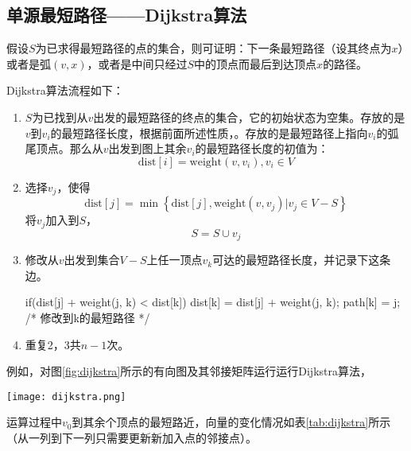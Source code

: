 \subsection{单源最短路径——Dijkstra算法}
\label{sec:dijkstra}

假设$S$为已求得最短路径的点的集合，则可证明：下一条最短路径（设其终点为$x$）或者是弧$(v, x)$，或者是中间只经过$S$中的顶点而最后到达顶点$x$的路径。

Dijkstra算法流程如下：
\begin{enumerate}
\item $S$为已找到从$v$出发的最短路径的终点的集合，它的初始状态为空集。存放的是$v$到$v_i$的最短路径长度，根据前面所述性质，。存放的是最短路径上指向$v_i$的弧尾顶点。那么从$v$出发到图上其余$v_i$的最短路径长度的初值为：
$$
\text{dist}[i] = \text{weight}(v, v_i), v_i \in V
$$
\item 选择$v_j$，使得
$$
\text{dist}[j]=\min\left\{\text{dist}[j], \text{weight}(v, v_j)|v_j \in V-S\right\}
$$
将$v_j$加入到$S$，
$$
S = S \cup {v_j}
$$
\item 修改从$v$出发到集合$V-S$上任一顶点$v_k$可达的最短路径长度，并记录下这条边。
\begin{Code}
if(dist[j] + weight(j, k) < dist[k]) {
    dist[k] = dist[j] + weight(j, k);
    path[k] = j; /* 修改到k的最短路径 */
}
\end{Code}
\item 重复2，3共$n-1$次。
\end{enumerate}

例如，对图\ref{fig:dijkstra}所示的有向图及其邻接矩阵运行运行Dijkstra算法，

\begin{center}
\texttt{[image: dijkstra.png]}\\
\label{fig:dijkstra}
\end{center}

运算过程中$v_0$到其余个顶点的最短路近，向量的变化情况如表\ref{tab:dijkstra}所示（从一列到下一列只需要更新新加入点的邻接点）。

